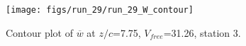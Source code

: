 \begin{figure}[H]
\centering
\texttt{[image: figs/run\_29/run\_29\_W\_contour]}
\caption{Contour plot of $\overline{w}$ at $z/c$=7.75, $V_{free}$=31.26, station 3.}
\label{fig:run_29_W_contour}
\end{figure}


